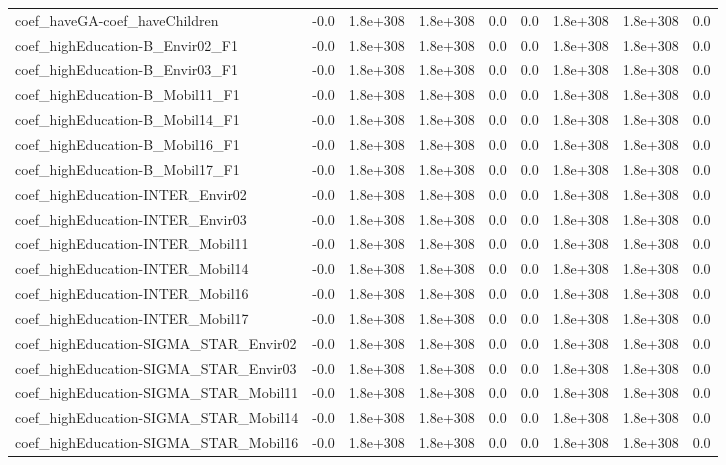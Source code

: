 \begin{tabular}{lrrrrrrrr}
coef_haveGA-coef_haveChildren & -0.0 & 1.8e+308 & 1.8e+308 & 0.0 & 0.0 & 1.8e+308 & 1.8e+308 & 0.0 \\
coef_highEducation-B_Envir02_F1 & -0.0 & 1.8e+308 & 1.8e+308 & 0.0 & 0.0 & 1.8e+308 & 1.8e+308 & 0.0 \\
coef_highEducation-B_Envir03_F1 & -0.0 & 1.8e+308 & 1.8e+308 & 0.0 & 0.0 & 1.8e+308 & 1.8e+308 & 0.0 \\
coef_highEducation-B_Mobil11_F1 & -0.0 & 1.8e+308 & 1.8e+308 & 0.0 & 0.0 & 1.8e+308 & 1.8e+308 & 0.0 \\
coef_highEducation-B_Mobil14_F1 & -0.0 & 1.8e+308 & 1.8e+308 & 0.0 & 0.0 & 1.8e+308 & 1.8e+308 & 0.0 \\
coef_highEducation-B_Mobil16_F1 & -0.0 & 1.8e+308 & 1.8e+308 & 0.0 & 0.0 & 1.8e+308 & 1.8e+308 & 0.0 \\
coef_highEducation-B_Mobil17_F1 & -0.0 & 1.8e+308 & 1.8e+308 & 0.0 & 0.0 & 1.8e+308 & 1.8e+308 & 0.0 \\
coef_highEducation-INTER_Envir02 & -0.0 & 1.8e+308 & 1.8e+308 & 0.0 & 0.0 & 1.8e+308 & 1.8e+308 & 0.0 \\
coef_highEducation-INTER_Envir03 & -0.0 & 1.8e+308 & 1.8e+308 & 0.0 & 0.0 & 1.8e+308 & 1.8e+308 & 0.0 \\
coef_highEducation-INTER_Mobil11 & -0.0 & 1.8e+308 & 1.8e+308 & 0.0 & 0.0 & 1.8e+308 & 1.8e+308 & 0.0 \\
coef_highEducation-INTER_Mobil14 & -0.0 & 1.8e+308 & 1.8e+308 & 0.0 & 0.0 & 1.8e+308 & 1.8e+308 & 0.0 \\
coef_highEducation-INTER_Mobil16 & -0.0 & 1.8e+308 & 1.8e+308 & 0.0 & 0.0 & 1.8e+308 & 1.8e+308 & 0.0 \\
coef_highEducation-INTER_Mobil17 & -0.0 & 1.8e+308 & 1.8e+308 & 0.0 & 0.0 & 1.8e+308 & 1.8e+308 & 0.0 \\
coef_highEducation-SIGMA_STAR_Envir02 & -0.0 & 1.8e+308 & 1.8e+308 & 0.0 & 0.0 & 1.8e+308 & 1.8e+308 & 0.0 \\
coef_highEducation-SIGMA_STAR_Envir03 & -0.0 & 1.8e+308 & 1.8e+308 & 0.0 & 0.0 & 1.8e+308 & 1.8e+308 & 0.0 \\
coef_highEducation-SIGMA_STAR_Mobil11 & -0.0 & 1.8e+308 & 1.8e+308 & 0.0 & 0.0 & 1.8e+308 & 1.8e+308 & 0.0 \\
coef_highEducation-SIGMA_STAR_Mobil14 & -0.0 & 1.8e+308 & 1.8e+308 & 0.0 & 0.0 & 1.8e+308 & 1.8e+308 & 0.0 \\
coef_highEducation-SIGMA_STAR_Mobil16 & -0.0 & 1.8e+308 & 1.8e+308 & 0.0 & 0.0 & 1.8e+308 & 1.8e+308 & 0.0 \\

\end{tabular}
